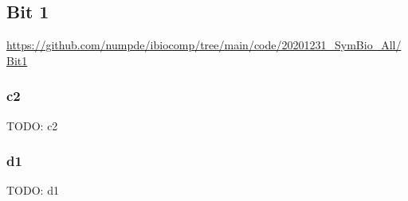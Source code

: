 \documentclass[12pt,notitlepage]{article}
\newcommand{\TODO}[1]{\textrm{\color{red}TODO: #1}}
\begin{document}
\subsection{Bit 1} \label{s:sim:bit1}

\url{https://github.com/numpde/ibiocomp/tree/main/code/20201231_SymBio_All/Bit1}


\subsubsection*{c2} \label{s:sim:bit1:c2}

\TODO{c2}


\subsubsection*{d1} \label{s:sim:bit1:d1}

\TODO{d1}
\end{document}
